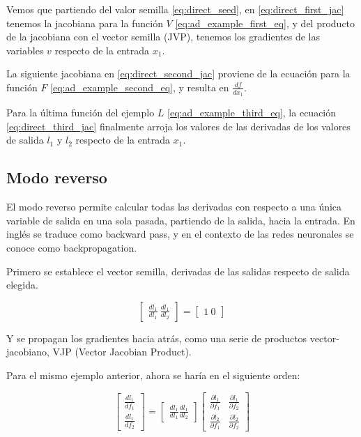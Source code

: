 Vemos que partiendo del valor semilla \eqref{eq:direct_seed}, en
\eqref{eq:direct_first_jac} tenemos la jacobiana para la función $V$
\eqref{eq:ad_example_first_eq}, y del producto de la jacobiana con el vector
semilla (JVP), tenemos los gradientes de las variables $v$ respecto de la entrada
$x_1$.

La siguiente jacobiana en \eqref{eq:direct_second_jac} proviene de la ecuación
para la función $F$ \eqref{eq:ad_example_second_eq}, y resulta en
$\frac{df}{dx_1}$.

Para la última función del ejemplo $L$ \eqref{eq:ad_example_third_eq}, la ecuación
\eqref{eq:direct_third_jac} finalmente arroja los valores de las derivadas de los
valores de salida $l_1$ y $l_2$ respecto de la entrada $x_1$.


\subsection{Modo reverso}

El modo reverso permite calcular todas las derivadas con respecto a una única
variable de salida en una sola pasada, partiendo de la salida, hacia la
entrada. En inglés se traduce como backward pass, y en el contexto de las redes
neuronales se conoce como backpropagation.

Primero se establece el vector semilla, derivadas de las salidas respecto de
salida elegida.

\begin{equation}
	\begin{bmatrix}
		\frac{dl_1}{dl_1} \
		\frac{dl_1}{dl_2}
	\end{bmatrix}
	=
	\begin{bmatrix}
		1 \
		0
	\end{bmatrix}
\end{equation}

Y se propagan los gradientes hacia atrás, como una serie de productos
vector-jacobiano, VJP (Vector Jacobian Product).

Para el mismo ejemplo anterior, ahora se haría en el siguiente orden:

\begin{equation}
	\begin{bmatrix}
		\frac{dl_1}{df_1} \\
		\frac{dl_1}{df_2}
	\end{bmatrix}
	=
	\begin{bmatrix}
		\frac{dl_1}{dl_1}
		\frac{dl_1}{dl_2}
	\end{bmatrix}
	\begin{bmatrix}
		\frac{\partial l_1}{\partial f_1} & \frac{\partial l_1}{\partial f_2} \\
		\frac{\partial l_2}{\partial f_1} & \frac{\partial l_2}{\partial f_2}
	\end{bmatrix}
\end{equation}

